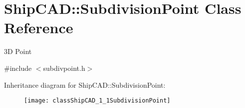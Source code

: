 \hypertarget{classShipCAD_1_1SubdivisionPoint}{}\section{Ship\+C\+AD\+:\+:Subdivision\+Point Class Reference}
\label{classShipCAD_1_1SubdivisionPoint}


3D Point  




{\ttfamily \#include $<$subdivpoint.\+h$>$}

Inheritance diagram for Ship\+C\+AD\+:\+:Subdivision\+Point\+:\begin{figure}[H]
\begin{center}
\leavevmode
\texttt{[image: classShipCAD\_1\_1SubdivisionPoint]}
\end{center}
\end{figure}
